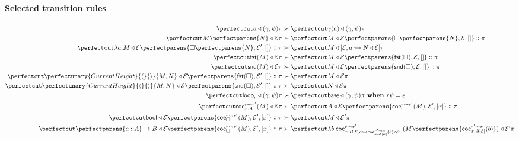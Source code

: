 \documentclass{article}
\newcommand\Clo[2]{#1\triangleleft{#2}}
\newcommand\Coe[4]{\mathsf{coe}^{#1\leadsto{#2}}_{#3} (#4)}
\newcommand\DFun[3]{\perfectparens{#1:#2}\to{#3}}
\newcommand\Lam[2]{\lambda{#1}.{#2}}
\newcommand\Fst[1]{\mathsf{fst} (#1)}
\newcommand\Snd[1]{\mathsf{snd} (#1)}
\newcommand\Loop[1]{\mathsf{loop}_{#1}}
\newcommand\Base{\mathsf{base}}
\newcommand\Cons[2]{{#1}\dblcolon{#2}}
\newcommand\AStep[2]{{#1}&\succ{#2}}
\newcommand\Bool{\mathsf{bool}}
\newcommand\Frame[3]{\perfectparens{#1,#2,#3}}
\newcommand\Cfg[3]{\cut{\Clo{#1}{#2}}{#3}}
\newcommand\App[2]{{#1}\perfectparens{#2}}
\newcommand\Pair[2]{\perfectunary{CurrentHeight}{\langle}{\rangle}{#1,#2}}
\begin{document}
\paragraph{Selected transition rules}
\begin{align}
  \AStep{
    \Cfg{a}{(\gamma,\psi)}{\pi}
  }{
    \Cfg{\gamma(a)}{(\gamma,\psi)}{\pi}
  }
  \\
  \AStep{
    \Cfg{\App{M}{N}}{\mathcal{E}}{\pi}
  }{
    \Cfg{M}{\mathcal{E}}{\Cons{\Frame{\App{\Box}{N}}{\mathcal{E}}{[]}}{\pi}}
  }
  \\
  \AStep{
    \Cfg{\Lam{a}{M}}{\mathcal{E}}{\Cons{\Frame{\App{\Box}{N}}{\mathcal{E}'}{[]}}{\pi}}
  }{
    \Cfg{M}{[\mathcal{E},a\hookrightarrow{\Clo{N}{\mathcal{E}}}]}{\pi}
  }
  \\
  \AStep{
    \Cfg{\Fst{M}}{\mathcal{E}}{\pi}
  }{
    \Cfg{M}{\mathcal{E}}{\Cons{\Frame{\Fst{\Box}}{\mathcal{E}}{[]}}{\pi}}
  }
  \\
  \AStep{
    \Cfg{\Snd{M}}{\mathcal{E}}{\pi}
  }{
    \Cfg{M}{\mathcal{E}}{\Cons{\Frame{\Snd{\Box}}{\mathcal{E}}{[]}}{\pi}}
  }
  \\
  \AStep{
    \Cfg{\Pair{M}{N}}{\mathcal{E}}{\Cons{\Frame{\Fst{\Box}}{\mathcal{E}'}{[]}}{\pi}}
  }{
    \Cfg{M}{\mathcal{E}}{\pi}
  }
  \\
  \AStep{
    \Cfg{\Pair{M}{N}}{\mathcal{E}}{\Cons{\Frame{\Snd{\Box}}{\mathcal{E}'}{[]}}{\pi}}
  }{
    \Cfg{N}{\mathcal{E}}{\pi}
  }
  \\
  \AStep{
    \Cfg{\Loop{r}}{(\gamma,\psi)}{\pi}
  }{
    \Cfg{\Base}{(\gamma,\psi)}{\pi}
  }
  \textbf{ when } r\psi = \epsilon
  \\
  \AStep{
    \Cfg{\Coe{r}{r'}{x.A}{M}}{\mathcal{E}}{\pi}
  }{
    \Cfg{A}{\mathcal{E}}{
      \Cons{
        \Frame{\Coe{r}{r'}{\Box}{M}}{\mathcal{E}'}{[x]}
      }{\pi}
    }
  }
  \\
  \AStep{
    \Cfg{\Bool}{\mathcal{E}}{
      \Cons{\Frame{\Coe{r}{r'}{\Box}{M}}{\mathcal{E}'}{[x]}}{\pi}
    }
  }{
    \Cfg{M}{\mathcal{E}'}{\pi}
  }
  \\
  \AStep{
    \Cfg{
      \DFun{a}{A}{B}
    }{
      \mathcal{E}
    }{
      \Cons{\Frame{\Coe{r}{r'}{\Box}{M}}{\mathcal{E}'}{[x]}}{\pi}
    }
  }{
    \Cfg{
      \Lam{b}{
        \Coe{r}{r'}{
          x.B[\mathcal{E},a\hookrightarrow \Clo{\Coe{r'}{x}{x.A[\mathcal{E}]}{b}}{\mathcal{E}'}]
        }{
          \App{M}{
            \Coe{r'}{r}{x. A[\mathcal{E}]}{b}
          }
        }
      }
    }{
      \mathcal{E}'
    }{
      \pi
    }
  }
\end{align}
\end{document}
